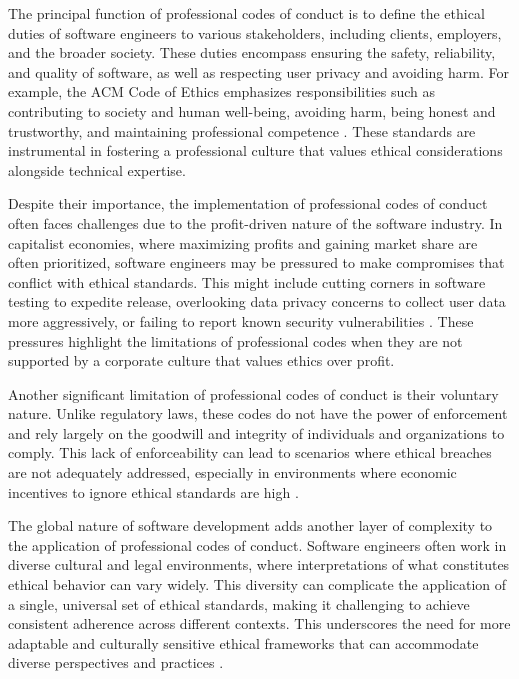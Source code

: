 \begin{refsection}
The principal function of professional codes of conduct is to define the ethical duties of software engineers to various stakeholders, including clients, employers, and the broader society. These duties encompass ensuring the safety, reliability, and quality of software, as well as respecting user privacy and avoiding harm. For example, the ACM Code of Ethics emphasizes responsibilities such as contributing to society and human well-being, avoiding harm, being honest and trustworthy, and maintaining professional competence \cite[pp.~1-4]{gotterbarn2018acm}. These standards are instrumental in fostering a professional culture that values ethical considerations alongside technical expertise.

Despite their importance, the implementation of professional codes of conduct often faces challenges due to the profit-driven nature of the software industry. In capitalist economies, where maximizing profits and gaining market share are often prioritized, software engineers may be pressured to make compromises that conflict with ethical standards. This might include cutting corners in software testing to expedite release, overlooking data privacy concerns to collect user data more aggressively, or failing to report known security vulnerabilities \cite[pp.~110-113]{baase2018gift}. These pressures highlight the limitations of professional codes when they are not supported by a corporate culture that values ethics over profit.

Another significant limitation of professional codes of conduct is their voluntary nature. Unlike regulatory laws, these codes do not have the power of enforcement and rely largely on the goodwill and integrity of individuals and organizations to comply. This lack of enforceability can lead to scenarios where ethical breaches are not adequately addressed, especially in environments where economic incentives to ignore ethical standards are high \cite[pp.~45-48]{johnson2008ethical}.

The global nature of software development adds another layer of complexity to the application of professional codes of conduct. Software engineers often work in diverse cultural and legal environments, where interpretations of what constitutes ethical behavior can vary widely. This diversity can complicate the application of a single, universal set of ethical standards, making it challenging to achieve consistent adherence across different contexts. This underscores the need for more adaptable and culturally sensitive ethical frameworks that can accommodate diverse perspectives and practices \cite[pp.~87-90]{whitbeck2012ethics}.


\end{refsection}
